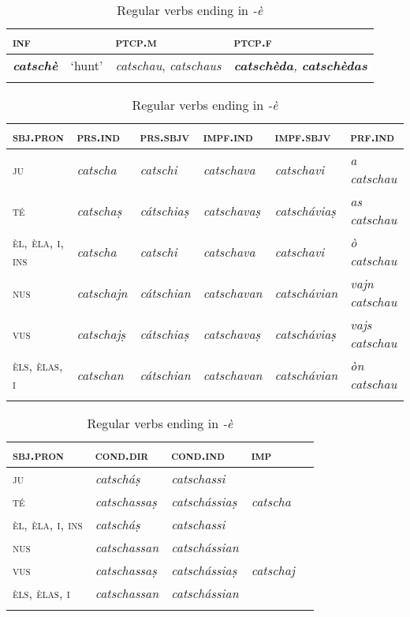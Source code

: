 \begin{table}
\caption{Regular verbs ending in \textit{-è}}
\label{conjè}
 \begin{tabularx}{.8\textwidth}{llll}
 
  \lsptoprule
  \textsc{inf}  && \textsc{ptcp.m}  & \textsc{ptcp.f}\\
  \midrule
  \textit{\textbf{catschè}} & `hunt' & \textit{catschau}, \textit{catschaus} & \textit{\textbf{catschèda}, \textit{\textbf{catschèdas}}}\\
  \lspbottomrule  
  \end{tabularx}
  
  \medskip
  
 \begin{tabularx}{\textwidth}{p{2cm}lllll}
  \lsptoprule
\textsc{sbj.pron} & \textsc{prs.ind} & \textsc{prs.sbjv} & \textsc{impf.ind} & \textsc{impf.sbjv} &\textsc{prf.ind}\\
 \midrule
\textsc{ju} &\textit{catscha} & \textit{catschi}&\textit{catschava} &\textit{catschavi} & \textit{a catschau}\\
\textsc{té} &\textit{catschaṣ} & \textit{cátschiaṣ}&\textit{catschavaṣ} &\textit{catscháviaṣ} &\textit{as catschau}\\
\textsc{èl, èla, i, ins}  & \textit{catscha} & \textit{catschi} & \textit{catschava} & \textit{catschavi} & \textit{ò catschau}\\
\textsc{nus} & \textit{catschajn} & \textit{cátschian} & \textit{catschavan} &\textit{catschávian} & \textit {vajn catschau}\\
\textsc{vus} &\textit{catschajṣ} &\textit{cátschiaṣ} & \textit{catschavaṣ} &\textit{catscháviaṣ} &\textit{vajs catschau}\\
\textsc{èls, èlas, i} & \textit{catschan} &\textit{cátschian} &\textit{catschavan} &\textit{catschávian} &\textit{òn catschau}\\

  \lspbottomrule
\end{tabularx}

\medskip

\begin{tabularx} {\textwidth}{p{2cm}llll}
 \lsptoprule
  \textsc{sbj.pron} &\textsc{cond.dir} &  \textsc{cond.ind}  &\textsc{imp}\\
\midrule
\textsc{ju} & \textit{catscháṣ}&\textit{catschassi} &\\
\textsc{té}  & \textit{catschassaṣ}&\textit{catschássiaṣ} &\textit{catscha}\\
\textsc{èl, èla, i, ins} & \textit{catscháṣ} &\textit{catschassi} &\\
\textsc{nus} & \textit{catschassan} & \textit{catschássian} &\\
\textsc{vus} & \textit{catschassaṣ} & \textit{catschássiaṣ} &\textit{catschaj}\\
\textsc{èls, èlas, i} & \textit{catschassan} & \textit{catschássian}&\\

  \lspbottomrule
 \end{tabularx} 
\end{table}

